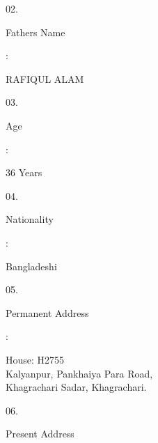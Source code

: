 \documentclass[12pt]{article}
\begin{document}
\begin{minipage}[t]{0.05\linewidth}
02.
\end{minipage}
\begin{minipage}[t]{0.55\linewidth}
Fathers Name
\end{minipage}
\begin{minipage}[t]{0.02\linewidth}
:
\end{minipage}
\begin{minipage}[t]{0.38\linewidth}
RAFIQUL ALAM
\end{minipage}
\begin{minipage}[t]{0.05\linewidth}
03.
\end{minipage}
\begin{minipage}[t]{0.55\linewidth}
Age
\end{minipage}
\begin{minipage}[t]{0.02\linewidth}
:
\end{minipage}
\begin{minipage}[t]{0.38\linewidth}
36 Years
\end{minipage}
\begin{minipage}[t]{0.05\linewidth}
04.
\end{minipage}
\begin{minipage}[t]{0.55\linewidth}
Nationality
\end{minipage}
\begin{minipage}[t]{0.02\linewidth}
:
\end{minipage}
\begin{minipage}[t]{0.38\linewidth}
Bangladeshi
\end{minipage}
\begin{minipage}[t]{0.05\linewidth}
05.
\end{minipage}
\begin{minipage}[t]{0.55\linewidth}
Permanent Address
\end{minipage}
\begin{minipage}[t]{0.02\linewidth}
:
\end{minipage}
\begin{minipage}[t]{0.38\linewidth}
House: H2755
\\
Kalyanpur,
Pankhaiya Para Road,
\\
Khagrachari Sadar, Khagrachari.
\end{minipage}
\begin{minipage}[t]{0.05\linewidth}
06.
\end{minipage}
\begin{minipage}[t]{0.55\linewidth}
Present Address
\end{minipage}
\end{document}
